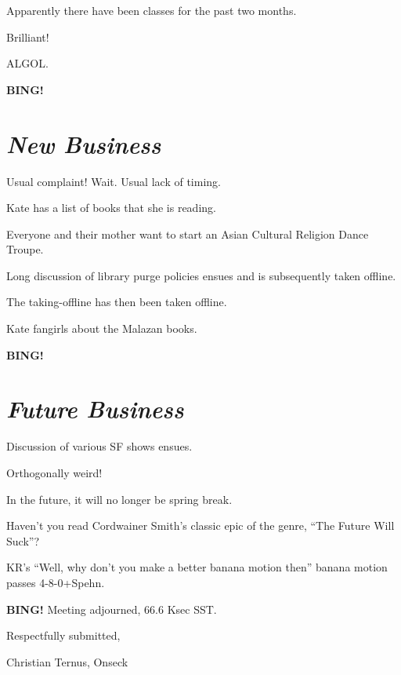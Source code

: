 \documentclass[10pt]{article}
\newcommand{\bing}{{\bf BING!} }
\newcommand{\goto}[1]{\bing \vskip 12pt \section*{{\em{#1}}}}
\begin{document}
Apparently there have been classes for the past two months.

Brilliant!

ALGOL.

\goto{New Business}

Usual complaint!  Wait.  Usual lack of timing.

Kate has a list of books that she is reading.

Everyone and their mother want to start an Asian Cultural Religion Dance Troupe.

Long discussion of library purge policies ensues and is subsequently
taken offline.

The taking-offline has then been taken offline.

Kate fangirls about the Malazan books.

\goto{Future Business}

Discussion of various SF shows ensues.

Orthogonally weird!

In the future, it will no longer be spring break.

Haven't you read Cordwainer Smith's classic epic of the genre, ``The
Future Will Suck''?

KR's ``Well, why don't you make a better banana motion then'' banana
motion passes 4-8-0+Spehn.

\bing
\noindent
Meeting adjourned, 66.6 Ksec SST.

\vspace{18pt}

\centerline{Respectfully submitted,}
\centerline{Christian Ternus, Onseck}
\end{document}
